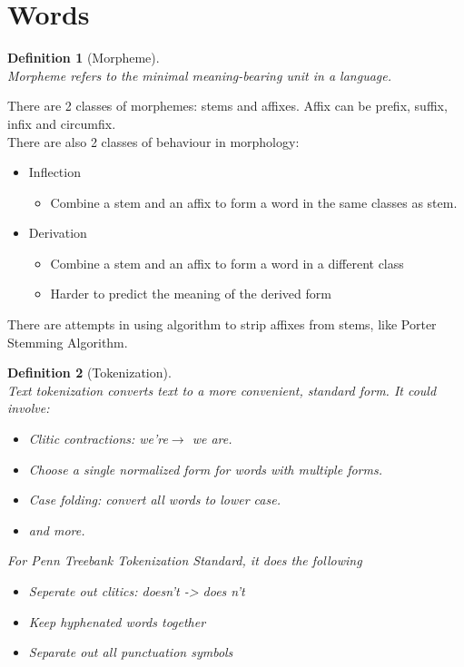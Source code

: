 \documentclass[12pt]{article}
\newtheorem{definition}{Definition}[section]
\theoremstyle{definition}
\begin{document}
\section{Words}
\begin{definition}[Morpheme]
\hfill\\\normalfont Morpheme refers to the minimal meaning-bearing unit in a language.
\end{definition}
There are 2 classes of morphemes: stems and affixes. Affix can be prefix, suffix, infix and circumfix.\\
There are also 2 classes of behaviour in morphology:
\begin{itemize}
	\item Inflection
	\begin{itemize}
		\item Combine a stem and an affix to form a word in the same classes as stem.
	\end{itemize}
	\item Derivation
	\begin{itemize}
		\item Combine a stem and an affix to form a word in a different class
		\item Harder to predict the meaning of the derived form
	\end{itemize}
\end{itemize}
There are attempts in using algorithm to strip affixes from stems, like Porter Stemming Algorithm.
\begin{definition}[Tokenization]
\hfill\\\normalfont Text tokenization converts text to a more convenient, standard form. It could involve:
\begin{itemize}
	\item Clitic contractions: we're$\rightarrow$ we are.
	\item Choose a single normalized form for words with multiple forms.
	\item Case folding: convert all words to lower case.
	\item and more.
\end{itemize}
For Penn Treebank Tokenization Standard, it does the following
\begin{itemize}
	\item Seperate out clitics: doesn't -> does n't
	\item Keep hyphenated words together
	\item Separate out all punctuation symbols
\end{itemize}
\end{definition}
\end{document}
